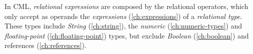 In CML, \emph{relational expressions} are composed by the relational operators,
which only accept as operands the \emph{expressions} (\ref{ch:expressions})
of a \emph{relational type}.
These types include \emph{String} (\ref{ch:string}),
the \emph{numeric} (\ref{ch:numeric-types})
and \emph{floating-point} (\ref{ch:floating-point}) types,
but exclude \emph{Boolean} (\ref{ch:boolean})
and references (\ref{ch:references}).
